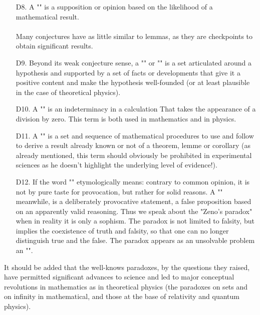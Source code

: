 \begin{itemize}
	\item[D8.] A "" is a supposition or opinion based on the likelihood of a mathematical result.\\\\
	Many conjectures have as little similar to lemmas, as they are checkpoints to obtain significant results.
	
	\item[D9.] Beyond its weak conjecture sense, a "" or "" is a set articulated around a hypothesis and supported by a set of facts or developments that give it a positive content and make the hypothesis well-founded (or at least plausible in the case of theoretical physics). 

	\item[D10.] A "" is an indeterminacy in a calculation That takes the appearance of a division by zero. This term is both used in mathematics and in physics. 

	\item[D11.] A "" is a set and sequence of mathematical procedures to use and follow to derive a result already known or not of a theorem, lemme or corollary (as already mentioned, this term should obviously be prohibited in experimental sciences as he doesn't highlight the underlying level of evidence!). 

	\item[D12.] If the word "" etymologically means: contrary to common opinion, it is not by pure taste for provocation, but rather for solid reasons. A "" meanwhile, is a deliberately provocative statement, a false proposition based on an apparently valid reasoning. Thus we speak about the "Zeno's paradox" when in reality it is only a sophism. The paradox is not limited to falsity, but implies the coexistence of truth and falsity, so that one can no longer distinguish true and the false. The paradox appears as an unsolvable problem an "". 
	
\end{itemize}

	\begin{tcolorbox}[title=Remark,colframe=black,arc=10pt]
It should be added that the well-knows paradoxes, by the questions they raised, have permitted significant advances to science and led to major conceptual revolutions in mathematics as in theoretical physics (the paradoxes on sets and on infinity in mathematical, and those at the base of relativity and quantum physics).
	\end{tcolorbox}	

